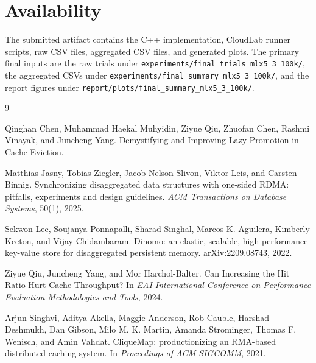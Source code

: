 \documentclass[letterpaper,twocolumn,10pt]{article}
\begin{document}
\section*{Availability}

The submitted artifact contains the C++ implementation, CloudLab runner scripts,
raw CSV files, aggregated CSV files, and generated plots. The primary final
inputs are the raw trials under \texttt{experiments/final\_trials\_mlx5\_3\_100k/},
the aggregated CSVs under \texttt{experiments/final\_summary\_mlx5\_3\_100k/},
and the report figures under \texttt{report/plots/final\_summary\_mlx5\_3\_100k/}.

\begin{thebibliography}{9}

Qinghan Chen, Muhammad Haekal Muhyidin, Ziyue Qiu, Zhuofan Chen, Rashmi
Vinayak, and Juncheng Yang.
\newblock Demystifying and Improving Lazy Promotion in Cache Eviction.

Matthias Jasny, Tobias Ziegler, Jacob Nelson-Slivon, Viktor Leis, and Carsten
Binnig.
\newblock Synchronizing disaggregated data structures with one-sided RDMA:
pitfalls, experiments and design guidelines.
\newblock \emph{ACM Transactions on Database Systems}, 50(1), 2025.

Sekwon Lee, Soujanya Ponnapalli, Sharad Singhal, Marcos K. Aguilera, Kimberly
Keeton, and Vijay Chidambaram.
\newblock Dinomo: an elastic, scalable, high-performance key-value store for
disaggregated persistent memory.
\newblock arXiv:2209.08743, 2022.

Ziyue Qiu, Juncheng Yang, and Mor Harchol-Balter.
\newblock Can Increasing the Hit Ratio Hurt Cache Throughput?
\newblock In \emph{EAI International Conference on Performance Evaluation
Methodologies and Tools}, 2024.

Arjun Singhvi, Aditya Akella, Maggie Anderson, Rob Cauble, Harshad Deshmukh,
Dan Gibson, Milo M. K. Martin, Amanda Strominger, Thomas F. Wenisch, and Amin
Vahdat.
\newblock CliqueMap: productionizing an RMA-based distributed caching system.
\newblock In \emph{Proceedings of ACM SIGCOMM}, 2021.

\end{thebibliography}

\end{document}
